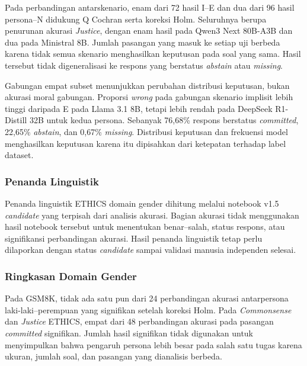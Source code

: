 Pada perbandingan antarskenario, enam dari 72 hasil I--E dan dua dari 96
hasil persona--N didukung Q Cochran serta koreksi Holm.
Seluruhnya berupa penurunan akurasi \textit{Justice}, dengan enam hasil pada
Qwen3 Next 80B-A3B dan dua pada Ministral 8B.
Jumlah pasangan yang masuk ke setiap uji berbeda karena tidak semua skenario
menghasilkan keputusan pada soal yang sama. Hasil tersebut tidak
digeneralisasi ke respons yang berstatus \textit{abstain} atau
\textit{missing}.

Gabungan empat subset menunjukkan perubahan distribusi keputusan, bukan
akurasi moral gabungan. Proporsi \textit{wrong} pada gabungan skenario
implisit lebih tinggi daripada E pada Llama 3.1 8B, tetapi lebih rendah pada
DeepSeek R1-Distill 32B untuk kedua persona. Sebanyak 76,68\% respons
berstatus \textit{committed}, 22,65\% \textit{abstain}, dan 0,67\%
\textit{missing}. Distribusi keputusan dan frekuensi model menghasilkan
keputusan karena itu dipisahkan dari ketepatan terhadap label dataset.

\subsubsection{Penanda Linguistik}
\label{subsubsec:penanda-gender-ethics}

Penanda linguistik ETHICS domain gender dihitung melalui notebook v1.5
\textit{candidate} yang terpisah dari analisis akurasi. Bagian akurasi tidak
menggunakan hasil notebook tersebut untuk menentukan benar--salah, status
respons, atau signifikansi perbandingan akurasi. Hasil penanda linguistik tetap
perlu dilaporkan dengan status \textit{candidate} sampai validasi manusia
independen selesai.



\subsubsection{Ringkasan Domain Gender}
\label{subsubsec:ringkasan-gender-ethics}

Pada GSM8K, tidak ada satu pun dari 24 perbandingan akurasi antarpersona
laki-laki--perempuan yang signifikan setelah koreksi Holm. Pada
\textit{Commonsense} dan \textit{Justice} ETHICS, empat dari 48 perbandingan
akurasi pada pasangan \textit{committed} signifikan.
Jumlah hasil signifikan tidak digunakan untuk menyimpulkan bahwa pengaruh
persona lebih besar pada salah satu tugas karena ukuran, jumlah soal, dan
pasangan yang dianalisis berbeda.


